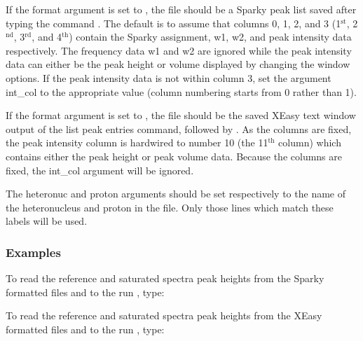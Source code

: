 If the format argument is set to 
, the file should be a Sparky  peak list saved after
typing the command 
.  The default is to assume that columns 0, 1, 2, and 3 (1$^\mathrm{st}$, 2$^\mathrm{nd}$,
3$^\mathrm{rd}$, and 4$^\mathrm{th}$) contain the Sparky  assignment, w1, w2, and peak intensity data respectively.
The frequency data w1 and w2 are ignored while the peak intensity data can either be the
peak height or volume displayed  by changing the window options.  If the peak intensity data
is not within column 3, set the argument int\_col to the appropriate value (column numbering
starts from 0 rather than 1).

If the format argument is set to 
, the file should be the saved XEasy text window
output of the list peak entries command, 
 followed by 
.  As the columns are fixed,
the peak intensity column is hardwired to number 10 (the 11$^\mathrm{th}$ column) which contains either
the peak height or peak volume data.  Because the columns are fixed, the int\_col argument
will be ignored.


The heteronuc and proton arguments should be set respectively to the name of the
heteronucleus and proton in the file.  Only those lines which match these labels will be
used.


\subsubsection{Examples}

To read  the reference and saturated spectra peak heights from the Sparky  formatted files
 and 
 to the run 
, type:




To read  the reference and saturated spectra peak heights from the XEasy formatted files
 and 
 to the run 
, type:





